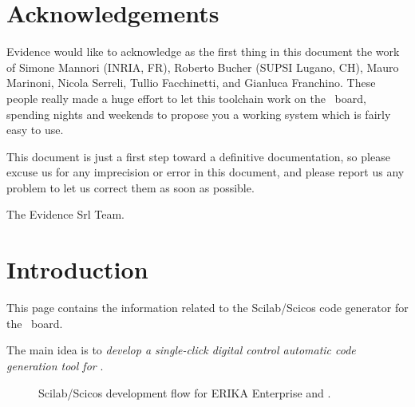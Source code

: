 \chapter{Acknowledgements}
\label{ch:ack}

Evidence would like to acknowledge as the first thing in this document
the work of Simone Mannori (INRIA, FR), Roberto Bucher (SUPSI Lugano,
CH), Mauro Marinoni, Nicola Serreli, Tullio Facchinetti, and Gianluca
Franchino. These people really made a huge effort to let this
toolchain work on the \flex\ board, spending nights and weekends to
propose you a working system which is fairly easy to use.

This document is just a first step toward a definitive documentation,
so please excuse us for any imprecision or error in this document, and
please report us any problem to let us correct them as soon as possible.

\begin{flushright}
The Evidence Srl Team.
\end{flushright}



\chapter{Introduction}
\label{ch:intro}

This page contains the information related to the Scilab/Scicos code
generator for the \flex\ board.

The main idea is to {\em develop a single-click digital control
automatic code generation tool for \flex}. 

\begin{figure}[htb]
\caption{Scilab/Scicos development flow for ERIKA Enterprise and \flex.}
\label{fig:development flow}
\end{figure}


